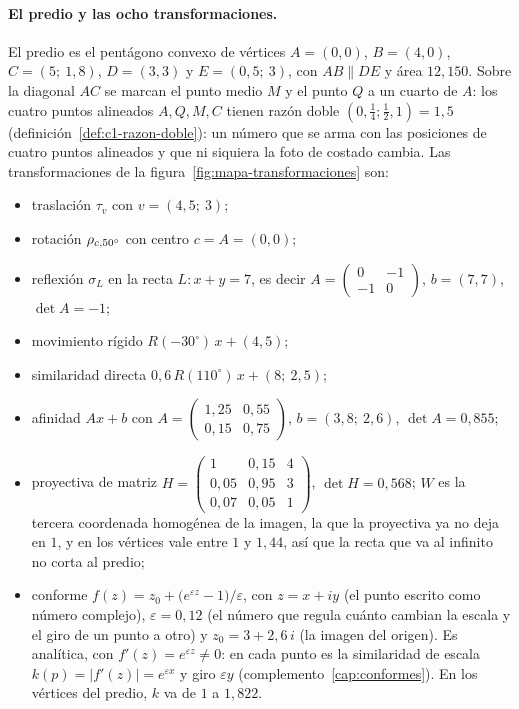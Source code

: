 \paragraph{El predio y las ocho transformaciones.} El predio es el pentágono convexo de
vértices \(A=(0,0)\), \(B=(4,0)\), \(C=(5;\ 1{,}8)\), \(D=(3,3)\) y \(E=(0{,}5;\ 3)\), con
\(AB\parallel DE\) y área \(12{,}150\). Sobre la diagonal \(AC\) se marcan el punto medio
\(M\) y el punto \(Q\) a un cuarto de \(A\): los cuatro puntos alineados \(A,Q,M,C\) tienen
razón doble \((0,\tfrac14;\tfrac12,1)=1{,}5\) (definición~\ref{def:c1-razon-doble}): un número
que se arma con las posiciones de cuatro puntos alineados y que ni siquiera la foto de costado
cambia. Las
transformaciones de la figura~\ref{fig:mapa-transformaciones} son:
\begin{itemize}
\item traslación \(\tau_v\) con \(v=(4{,}5;\ 3)\);
\item rotación \(\rho_{c,50^\circ}\) con centro \(c=A=(0,0)\);
\item reflexión \(\sigma_L\) en la recta \(L\colon x+y=7\), es decir
\(A=\left(\begin{smallmatrix}0&-1\\-1&0\end{smallmatrix}\right)\), \(b=(7,7)\), \(\det A=-1\);
\item movimiento rígido \(R(-30^\circ)\,x+(4,5)\);
\item similaridad directa \(0{,}6\,R(110^\circ)\,x+(8;\ 2{,}5)\);
\item afinidad \(Ax+b\) con \(A=\left(\begin{smallmatrix}1{,}25&0{,}55\\0{,}15&0{,}75\end{smallmatrix}\right)\),
\(b=(3{,}8;\ 2{,}6)\), \(\det A=0{,}855\);
\item proyectiva de matriz
\(H=\left(\begin{smallmatrix}1&0{,}15&4\\0{,}05&0{,}95&3\\0{,}07&0{,}05&1\end{smallmatrix}\right)\),
\(\det H=0{,}568\); \(W\) es la tercera coordenada homogénea de la imagen, la que la proyectiva
ya no deja en \(1\), y en los vértices vale entre \(1\) y \(1{,}44\), así que la recta que va
al infinito no corta al predio;
\item conforme \(f(z)=z_0+\bigl(e^{\varepsilon z}-1\bigr)/\varepsilon\), con \(z=x+iy\) (el
punto escrito como número complejo), \(\varepsilon=0{,}12\) (el número que regula cuánto cambian
la escala y el giro de un punto a otro) y \(z_0=3+2{,}6\,i\) (la imagen del origen). Es analítica, con \(f'(z)=e^{\varepsilon z}\neq0\):
en cada punto es la similaridad de escala \(k(p)=\lvert f'(z)\rvert=e^{\varepsilon x}\) y giro
\(\varepsilon y\) (complemento~\ref{cap:conformes}). En los vértices del predio, \(k\) va de
\(1\) a \(1{,}822\).
\end{itemize}

